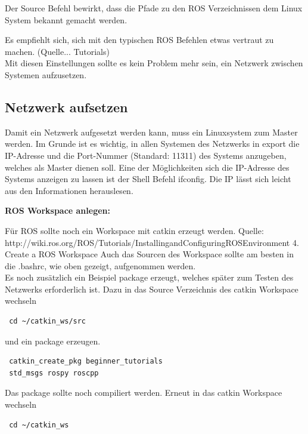 \documentclass[12pt]{article}
\begin{document}
Der Source Befehl bewirkt, dass die Pfade zu den ROS Verzeichnissen dem Linux System bekannt gemacht werden.

Es empfiehlt sich, sich mit den typischen ROS Befehlen etwas vertraut zu machen. (Quelle... Tutorials) \\
Mit diesen Einstellungen sollte es kein Problem mehr sein, ein Netzwerk zwischen Systemen aufzusetzen.
\subsection{Netzwerk aufsetzen}
Damit ein Netzwerk aufgesetzt werden kann, muss ein Linuxsystem zum Master werden.
Im Grunde ist es wichtig, in allen Systemen des Netzwerks in export die IP-Adresse und die Port-Nummer (Standard: 11311) des Systems anzugeben, welches als Master dienen soll.
Eine der Möglichkeiten sich die IP-Adresse des Systems anzeigen zu lassen ist der Shell Befehl ifconfig.
Die IP lässt sich leicht aus den Informationen herauslesen.

{\bf ROS Workspace anlegen:}

Für ROS sollte noch ein Workspace mit catkin erzeugt werden.
Quelle: http://wiki.ros.org/ROS/Tutorials/InstallingandConfiguringROSEnvironment
4. Create a ROS Workspace
Auch das Sourcen des Workspace sollte am besten in die .bashrc, wie oben gezeigt, aufgenommen werden. \\
Es noch zusätzlich ein Beispiel package erzeugt, welches später zum Testen des Netzwerks erforderlich ist.
Dazu in das Source Verzeichnis des catkin Workspace wechseln

 \begin{lstlisting}
 cd ~/catkin_ws/src
 \end{lstlisting}

und ein package erzeugen. 

 \begin{lstlisting}
 catkin_create_pkg beginner_tutorials
 std_msgs rospy roscpp
 \end{lstlisting}

Das package sollte noch compiliert werden.
Erneut in  das catkin Workspace wechseln

 \begin{lstlisting}
 cd ~/catkin_ws
 \end{lstlisting}
\end{document}
